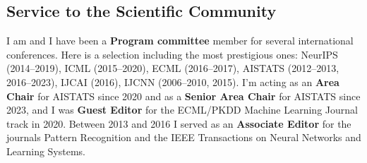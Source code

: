 \documentclass[oneside, a4paper, onecolumn, 10pt]{article}
\begin{document}



\subsection*{Service to the Scientific Community}

I am and I have been a {\bf Program committee} member for several international conferences. 
Here is a selection including the most prestigious ones:
  NeurIPS (2014--2019),
  ICML (2015--2020),
  ECML (2016--2017),
  AISTATS (2012--2013, 2016--2023), 
  IJCAI (2016),
  IJCNN (2006--2010, 2015).
I'm acting as an {\bf Area Chair} for AISTATS since 2020 and as a {\bf Senior Area Chair} for AISTATS since 2023, and I was {\bf Guest Editor} for the ECML/PKDD Machine Learning Journal track in 2020.
Between 2013 and 2016 I served as an {\bf Associate Editor} for the journals Pattern Recognition and the IEEE Transactions on Neural Networks and Learning Systems.



\end{document}

